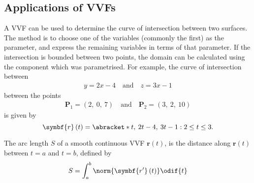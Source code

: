 \documentclass{article}
\begin{document}
\subsection{Applications of VVFs}
\begin{theorem}
    A VVF can be used to determine the curve of intersection between two
    surfaces. The method is to choose one of the variables (commonly the
    first) as the parameter, and express the remaining variables in
    terms of that parameter. If the intersection is bounded between two
    points, the domain can be calculated using the component which was
    parametrised. For example, the curve of intersection between
    \begin{align*}
        y = 2x - 4 \quad \text{and} \quad z = 3x - 1
    \end{align*}
    between the points
    \begin{align*}
        \symbf{P}_1 = \left( 2,\: 0,\: 7 \right) \quad \text{and} \quad \symbf{P}_2 = \left( 3,\: 2,\: 10 \right)
    \end{align*}
    is given by
    \begin{equation*}
        \symbf{r}\left( t \right) = \abracket*{t,\: 2t - 4,\: 3t - 1} : 2 \leq t \leq 3.
    \end{equation*}
\end{theorem}
\begin{definition}
    The arc length \(S\) of a smooth continuous VVF \(\symbf{r}\left( t \right)\), is
    the distance along \(\symbf{r}\left( t \right)\) between \(t=a\) and \(t=b\),
    defined by
    \begin{equation*}
        S = \int_a^b \norm{\symbf{r'}\left( t \right)} \odif{t}
    \end{equation*}
\end{definition}
\newpage
\end{document}
